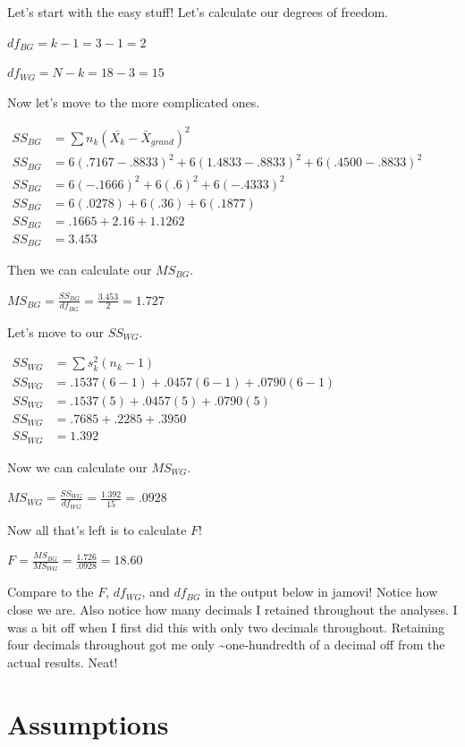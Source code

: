 \documentclass[
]{book}
\begin{document}
Let's start with the easy stuff! Let's calculate our degrees of freedom.

\(df_{BG} = k - 1 = 3 -1 = 2\)

\(df_{WG} = N - k = 18 - 3 = 15\)

Now let's move to the more complicated ones.

\(\begin{aligned} SS_{BG} &= \sum{n_k}(\bar{X_k}-\bar{X}_{grand})^2 \\ SS_{BG} &= 6(.7167-.8833)^2 + 6(1.4833-.8833)^2 + 6(.4500-.8833)^2 \\ SS_{BG} &= 6(-.1666)^2 + 6(.6)^2 + 6(-.4333)^2 \\ SS_{BG} &= 6(.0278) + 6(.36) + 6(.1877) \\ SS_{BG} &= .1665 + 2.16 + 1.1262 \\ SS_{BG} &= 3.453 \end{aligned}\)

Then we can calculate our \(MS_{BG}\).

\(MS_{BG} = \frac{SS_{BG}}{df_{BG}} = \frac{3.453}{2} = 1.727\)

Let's move to our \(SS_{WG}\).

\(\begin{aligned} SS_{WG} &= \sum{s_k^2}(n_k - 1) \\ SS_{WG} &= .1537(6-1) + .0457(6-1) + .0790(6-1) \\ SS_{WG} &= .1537(5) + .0457(5) + .0790(5) \\ SS_{WG} &= .7685 + .2285 + .3950 \\ SS_{WG} &= 1.392 \end{aligned}\)

Now we can calculate our \(MS_{WG}\).

\(MS_{WG} = \frac{SS_{WG}}{df_{WG}} = \frac{1.392}{15} = .0928\)

Now all that's left is to calculate \(F\)!

\(F = \frac{MS_{BG}}{MS_{WG}} = \frac{1.726}{.0928} = 18.60\)

Compare to the \(F\), \(df_{WG}\), and \(df_{BG}\) in the output below in jamovi! Notice how close we are. Also notice how many decimals I retained throughout the analyses. I was a bit off when I first did this with only two decimals throughout. Retaining four decimals throughout got me only \textasciitilde one-hundredth of a decimal off from the actual results. Neat!

\hypertarget{anova-assumptions}{%
\section{Assumptions}\label{anova-assumptions}}
\end{document}
